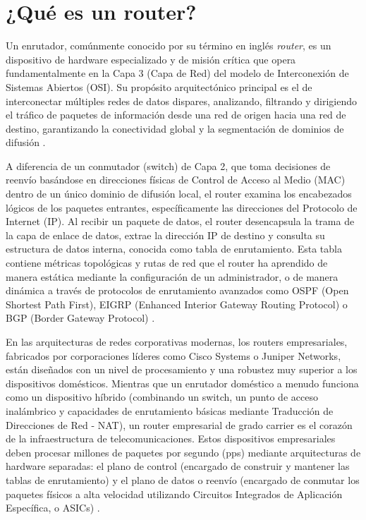 \documentclass[a4paper,12pt]{article}
\begin{document}
\renewcommand{\footrulewidth}{0.4pt}  %

\setcounter{page}{1}

\tableofcontents

\newpage

\section{¿Qué es un router?}

Un enrutador, comúnmente conocido por su término en inglés \textit{router}, es un dispositivo de hardware especializado y de misión crítica que opera fundamentalmente en la Capa 3 (Capa de Red) del modelo de Interconexión de Sistemas Abiertos (OSI). Su propósito arquitectónico principal es el de interconectar múltiples redes de datos dispares, analizando, filtrando y dirigiendo el tráfico de paquetes de información desde una red de origen hacia una red de destino, garantizando la conectividad global y la segmentación de dominios de difusión \cite{cisco_router_basics}. 

A diferencia de un conmutador (switch) de Capa 2, que toma decisiones de reenvío basándose en direcciones físicas de Control de Acceso al Medio (MAC) dentro de un único dominio de difusión local, el router examina los encabezados lógicos de los paquetes entrantes, específicamente las direcciones del Protocolo de Internet (IP). Al recibir un paquete de datos, el router desencapsula la trama de la capa de enlace de datos, extrae la dirección IP de destino y consulta su estructura de datos interna, conocida como tabla de enrutamiento. Esta tabla contiene métricas topológicas y rutas de red que el router ha aprendido de manera estática mediante la configuración de un administrador, o de manera dinámica a través de protocolos de enrutamiento avanzados como OSPF (Open Shortest Path First), EIGRP (Enhanced Interior Gateway Routing Protocol) o BGP (Border Gateway Protocol) \cite{cisco_router_basics}. 

En las arquitecturas de redes corporativas modernas, los routers empresariales, fabricados por corporaciones líderes como Cisco Systems o Juniper Networks, están diseñados con un nivel de procesamiento y una robustez muy superior a los dispositivos domésticos. Mientras que un enrutador doméstico a menudo funciona como un dispositivo híbrido (combinando un switch, un punto de acceso inalámbrico y capacidades de enrutamiento básicas mediante Traducción de Direcciones de Red - NAT), un router empresarial de grado carrier es el corazón de la infraestructura de telecomunicaciones. Estos dispositivos empresariales deben procesar millones de paquetes por segundo (pps) mediante arquitecturas de hardware separadas: el plano de control (encargado de construir y mantener las tablas de enrutamiento) y el plano de datos o reenvío (encargado de conmutar los paquetes físicos a alta velocidad utilizando Circuitos Integrados de Aplicación Específica, o ASICs) \cite{mpls_presentation}.
\end{document}
